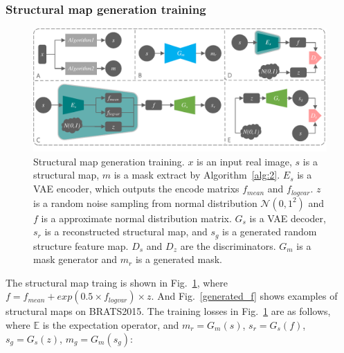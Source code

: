 \documentclass[runningheads]{llncs}
\begin{document}
	\subsubsection{Structural map generation training}
	\begin{figure}[thbp!]
		\centering
		\includegraphics[width=0.95\columnwidth]{figures/feature_train}
		\caption{Structural map generation training. $x$ is an input real image, $s$ is a structural map, $m$ is a mask extract by Algorithm~\ref{alg:2}. $E_s$ is a VAE encoder, which outputs the encode matrixs $f_{mean}$ and $f_{logvar}$. $z$ is a random noise sampling from normal distribution $\mathcal{N}(0,1^2)$ and $f$ is a approximate normal distribution matrix. $G_s$ is a VAE decoder, $s_r$ is a reconstructed structural map, and $s_g$ is a generated random structure feature map. $D_{s}$ and $D_{z}$ are the discriminators. $G_m$ is a mask generator and $m_r$ is a generated mask. }
		\label{feature_train}
	\end{figure}
	The structural map traing is shown in Fig.~\ref{feature_train}, where $f=f_{mean}+exp(0.5\times f_{logvar})\times z$. And Fig.~\ref{generated_f} shows examples of structural maps on BRATS2015. The training losses in Fig.~\ref{feature_train} are as follows, where $\mathbb{E}$ is the expectation operator, and $m_r=G_m(s)$, $s_r=G_s(f)$, $s_g=G_s(z)$, $m_g=G_m(s_g)$: 
\end{document}
